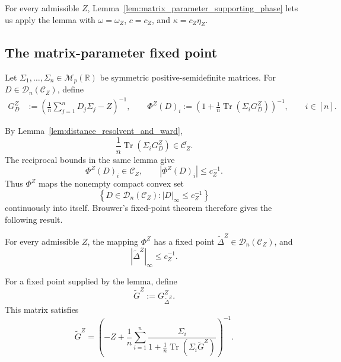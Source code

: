 \documentclass[EJP, preprint, NODS, nobera, nofontexpansion]{ejpecp}
\DeclareMathOperator{\tr}{Tr}
\begin{document}
For every admissible \(Z\), Lemma~\ref{lem:matrix_parameter_supporting_phase}
lets us apply the lemma with \(\omega=\omega_Z\), \(c=c_Z\), and
\(\kappa=c_Z\eta_Z\).

\subsection{The matrix-parameter fixed point}
Let $\Sigma_1,\ldots,\Sigma_n\in\mathcal M_p(\mathbb R)$ be symmetric
positive-semidefinite matrices.
For \(D\in\mathcal D_n(\mathcal C_Z)\), define
\begin{align}\label{eq:def_matrix_parameter_resolvent}
    G_D^Z
    &:={}
    \left(
        \frac1n\sum_{j=1}^nD_j\Sigma_j-Z
    \right)^{-1},
    \qquad
    \Phi^Z(D)_i
    :={}
    \left(
        1+\frac1n\tr(\Sigma_iG_D^Z)
    \right)^{-1},
    \qquad i\in[n].
\end{align}

By Lemma~\ref{lem:distance_resolvent_and_ward},
\[
    \frac1n\tr(\Sigma_iG_D^Z)
    \in\overline{\mathcal C_Z}.
\]
The reciprocal bounds in the same lemma give
\[
    \Phi^Z(D)_i\in\mathcal C_Z,
    \qquad
    |\Phi^Z(D)_i|\leq c_Z^{-1}.
\]
Thus \(\Phi^Z\) maps the nonempty compact convex set
\[
    \left\{
        D\in\mathcal D_n(\mathcal C_Z):
        |D|_\infty\leq c_Z^{-1}
    \right\}
\]
continuously into itself.  Brouwer's fixed-point theorem therefore gives the following result.

\begin{lemma}
\label{lem:fixed_point_compact_invariant_set}
For every admissible \(Z\), the mapping \(\Phi^Z\) has a fixed point
\(\widetilde\Delta^Z\in\mathcal D_n(\mathcal C_Z)\), and
\[
    |\widetilde\Delta^Z|_\infty\leq c_Z^{-1}.
\]
\end{lemma}

For a fixed point supplied by the lemma, define
\[
    \widetilde G^Z:=G_{\widetilde\Delta^Z}^Z.
\]
This matrix satisfies
\begin{equation}\label{eq:matrix_parameter_deterministic_equation}
    \widetilde G^Z
    =
    \left(
        -Z+\frac1n\sum_{i=1}^n
        \frac{\Sigma_i}
        {1+\frac1n\tr(\Sigma_i\widetilde G^Z)}
    \right)^{-1}.
\end{equation}
\end{document}
